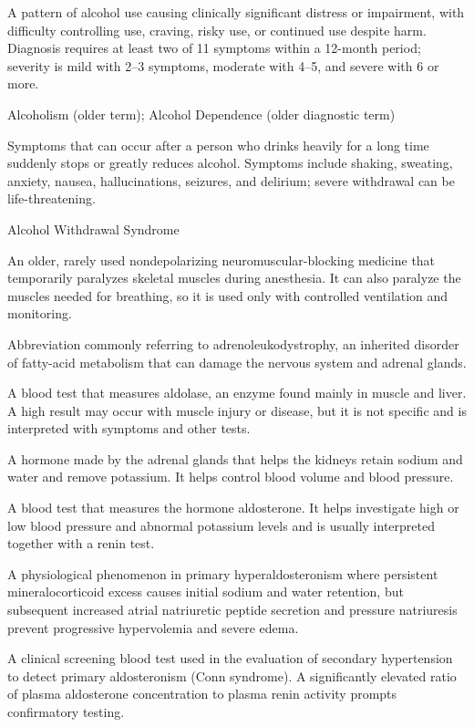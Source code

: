 A pattern of alcohol use causing clinically significant distress or impairment, with difficulty controlling use, craving, risky use, or continued use despite harm. Diagnosis requires at least two of 11 symptoms within a 12-month period; severity is mild with 2–3 symptoms, moderate with 4–5, and severe with 6 or more.

\synonyms
Alcoholism (older term); Alcohol Dependence (older diagnostic term)

 Symptoms that can occur after a person who drinks heavily for a long time suddenly stops or greatly reduces alcohol. Symptoms include shaking, sweating, anxiety, nausea, hallucinations, seizures, and delirium; severe withdrawal can be life-threatening.

\synonyms
Alcohol Withdrawal Syndrome

 An older, rarely used nondepolarizing neuromuscular-blocking medicine that temporarily paralyzes skeletal muscles during anesthesia. It can also paralyze the muscles needed for breathing, so it is used only with controlled ventilation and monitoring.

 Abbreviation commonly referring to adrenoleukodystrophy, an inherited disorder of fatty-acid metabolism that can damage the nervous system and adrenal glands.

 A blood test that measures aldolase, an enzyme found mainly in muscle and liver. A high result may occur with muscle injury or disease, but it is not specific and is interpreted with symptoms and other tests.

 A hormone made by the adrenal glands that helps the kidneys retain sodium and water and remove potassium. It helps control blood volume and blood pressure.

 A blood test that measures the hormone aldosterone. It helps investigate high or low blood pressure and abnormal potassium levels and is usually interpreted together with a renin test.

 A physiological phenomenon in primary hyperaldosteronism where persistent mineralocorticoid excess causes initial sodium and water retention, but subsequent increased atrial natriuretic peptide secretion and pressure natriuresis prevent progressive hypervolemia and severe edema.

 A clinical screening blood test used in the evaluation of secondary hypertension to detect primary aldosteronism (Conn syndrome). A significantly elevated ratio of plasma aldosterone concentration to plasma renin activity prompts confirmatory testing.

